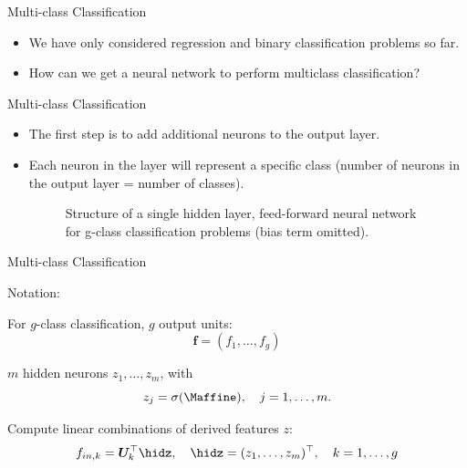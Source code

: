 \begin{frame} {Multi-class Classification}
\vspace{20mm}
\begin{itemize}
\item We have only considered regression and binary classification problems so far.
\vspace{5mm}
\item How can we get a neural network to perform multiclass classification?
  \end{itemize}
\end{frame}

\begin{frame} {Multi-class Classification}
\begin{itemize}
\item The first step is to add additional neurons to the output layer.
\item Each neuron in the layer will represent a specific class (number of neurons in the output layer = number of classes).
\begin{figure}
\centering
{}
\caption{\footnotesize Structure of a single hidden layer, feed-forward neural network for g-class classification problems (bias term omitted).}
\end{figure}
\end{itemize}
\end{frame}

\begin{frame} {Multi-class Classification}
\vspace{5mm}
\begin{blocki}{Notation:}
\item For $g$-class classification, $g$ output units: $$\mathbf{f} = (f_1, \dots, f_g)$$
\vspace{4mm}
\item $m$ hidden neurons $z_1, \dots, z_m$, with
    $$ z_j = \sigma(\Maffine), \quad j = 1,\ldots,m. $$
\item Compute linear combinations of derived features $z$:
    $$ f_{in,k} = \bm{U}_k^\top \hidz, \quad \hidz=(z_1,\dots, z_m)^\top, \quad k = 1,\ldots,g$$
\end{blocki}
\end{frame}

